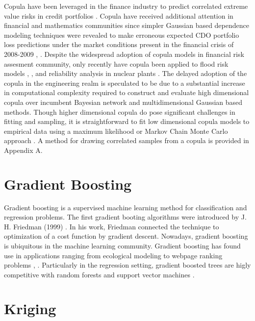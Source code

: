 Copula have been leveraged in the finance industry to
predict correlated extreme value risks in credit portfolios
\cite{Geidosch2016}.  Copula have received additional attention in financial and mathematics communities since 
simpler Gaussian based dependence modeling techniques were revealed to make erroneous expected CDO portfolio loss predictions under the market conditions present in the financial crisis of
2008-2009 \cite{MacKenzie2013}, \cite{Li2000}.  Despite the widespread adoption of copula models in financial risk assesment community, only recently have copula been applied to flood risk
models \cite{Dupuis2007}, \cite{Ganguli2012}, and reliability analysis in nuclear plants
\cite{Kelly2007}.  The delayed adoption of the copula in the
engineering realm is speculated to be due to a substantial increase in computational
complexity required to construct and evaluate high dimensional copula over
incumbent Bayesian network and multidimensional Gaussian based methods.  
Though higher dimensional copula do pose significant challenges in fitting and sampling, it is straightforward to fit low dimensional copula models to empirical data
using a maximum likelihood or Markov Chain Monte Carlo approach \cite{Jouini1996}.
A method for drawing correlated samples from a copula is provided in Appendix A.

\section{Gradient Boosting}

Gradient boosting is a supervised machine learning method for classification and regression problems.
The first gradient booting algorithms were introduced by J. H. Friedman (1999) \cite{friedman2001}.  In his work, Friedman connected the technique to optimization of a cost function by gradient descent.
Nowadays, gradient boosting is ubiquitous in the machine learning community.  Gradient boosting has found use in applications ranging from ecological modeling \cite{death2007} to webpage ranking problems \cite{Tyree2011}, \cite{chapelle2011}.  Particularly in the regression setting, gradient boosted trees are higly competitive with random forests and support vector machines \cite{moisen2006}. 

\section{Kriging}

